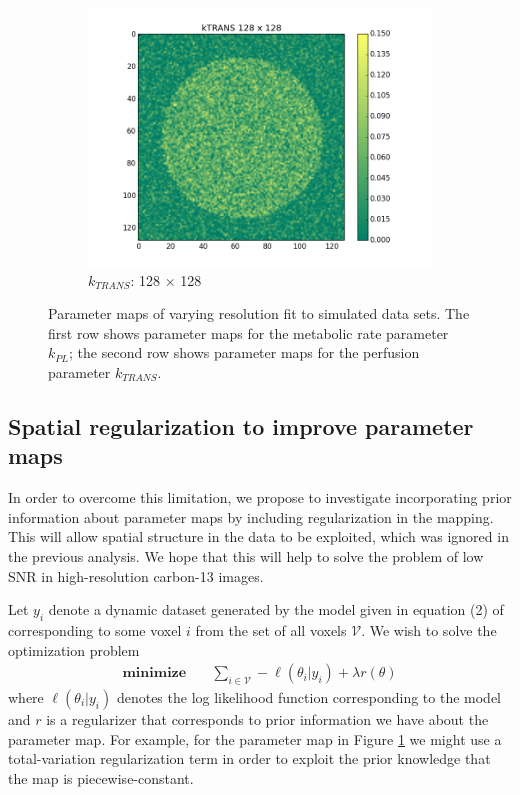 \documentclass{article}
\begin{document}
\begin{figure}[ht!]
    \begin{subfigure}[b]{0.25\textwidth}
        \includegraphics[width=\textwidth]{figs/kTRANS_128.png}
        \caption{$k_{TRANS}$: 128 $\times$ 128}
    \end{subfigure}
    \caption{Parameter maps of varying resolution fit to simulated data sets. The first row shows parameter maps for the metabolic rate parameter $k_{PL}$; the second row shows parameter maps for the perfusion parameter $k_{TRANS}$. }\label{fig:effect_of_resolution}
\end{figure}

\subsection{Spatial regularization to improve parameter maps} 
In order to overcome this limitation, we propose to investigate incorporating prior information about parameter maps by including regularization in the mapping. This will allow spatial structure in the data to be exploited, which was ignored in the previous analysis. We hope that this will help to solve the problem of low SNR in high-resolution carbon-13 images. 

Let $y_i$ denote a dynamic dataset generated by the model given in equation (2) of \cite{Maidens16} corresponding to some voxel $i$ from the set of all voxels $\mathcal{V}$. We wish to solve the optimization problem  
\begin{equation}
\begin{split}
\textbf{minimize} & \quad  \sum_{i \in \mathcal{V}} -\ell(\theta_i | y_i) + \lambda r(\theta) 
\end{split} 
\label{eq:opt}
\end{equation} 
where $\ell(\theta_i | y_i)$ denotes the log likelihood function corresponding to the model and $r$ is a regularizer that corresponds to prior information we have about the parameter map. For example, for the parameter map in Figure \ref{fig:effect_of_resolution} we might use a total-variation regularization term in order to exploit the prior knowledge that the map is piecewise-constant. 
\end{document}
